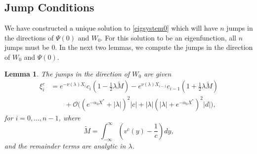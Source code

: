 \documentclass[12pt]{elsarticle}
\theoremstyle{plain}
\newtheorem{lemma}[theorem]{Lemma}
\theoremstyle{definition}
\theoremstyle{remark}
\numberwithin{theorem}{section}
\numberwithin{equation}{section}
\begin{document}
\subsection{Jump Conditions}

We have constructed a unique solution to \cref{eigsystem0} which will have $n$ jumps in the directions of $\Psi(0)$ and $W_0$. For this solution to be an eigenfunction, all $n$ jumps must be 0. In the next two lemmas, we compute the jumps in the direction of $W_0$ and $\Psi(0)$. 

\begin{lemma}\label{jumpcenteradj}
The jumps in the direction of $W_0$ are given 
\begin{equation}\label{jumpW0}
\begin{aligned}
\xi^c_i &= e^{-\nu(\lambda)X_i}c_i\left( 1 - \frac{1}{2}\lambda \tilde{M} \right) 
- e^{\nu(\lambda)X_{i-1}}c_{i-1}\left( 1 + \frac{1}{2}\lambda \tilde{M} \right) \\
&\qquad + \mathcal{O}\Big( (e^{-\alpha_0 X^*} + |\lambda|)^2 |c| + |\lambda| (|\lambda| + e^{-\alpha_0 X^*})^2 |d| \Big),
\end{aligned}
\end{equation}
for $i = 0, \dots, n-1$, where
\[
\tilde{M} = \int_{-\infty}^{\infty} \left(v^c(y) - \frac{1}{c}\right) dy,
\]
and the remainder terms are analytic in $\lambda$.


\end{lemma}
\end{document}

